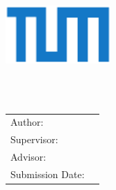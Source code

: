 \begin{titlepage}
  \centering

  \vspace{40mm}
  \includegraphics[width=40mm]{./figures/tum}

  \vspace{5mm}
  {\LARGE \MakeUppercase{\getUniversity{}}}\\

  \vspace{5mm}
  {\Large \MakeUppercase{\getFaculty{}}}\\

  \vspace{20mm}
  {\Large \getDoctype{}}

  \vspace{15mm}
  {\huge\bfseries \getTitle{}}

  \vspace{10mm}
  {\huge\bfseries \getTitleGer{}}

  \vspace{15mm}
  \begin{tabular}{l l}
    Author:          & \getAuthor{}         \\
    Supervisor:      & \getSupervisor{}     \\
    Advisor:         & \getAdvisor{}        \\
    Submission Date: & \getSubmissionDate{} \\
  \end{tabular}

  \vspace{20mm}
\end{titlepage}
